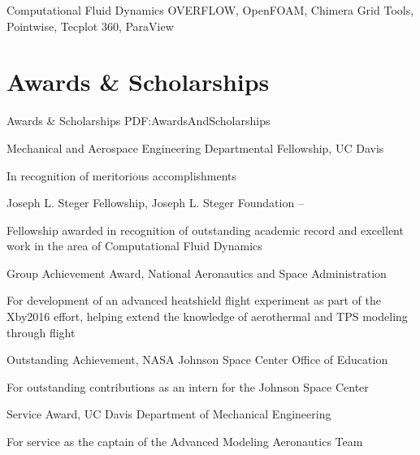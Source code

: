 \documentclass[letterpaper,MMMyyyy,nonstop]{simpleresumecv}
\begin{document}
\begin{body}
\GapNoBreak
Computational Fluid Dynamics
\BulletItem
OVERFLOW,
OpenFOAM,
Chimera Grid Tools,
Pointwise,
Tecplot 360,
ParaView





\section
{Awards \&\newline
Scholarships}
{Awards \& Scholarships}
{PDF:AwardsAndScholarships}

\BulletItem
Mechanical and Aerospace Engineering Departmental Fellowship,
UC Davis
\hfill
\begin{detail}
\SubItem
In recognition of meritorious accomplishments
\end{detail}

\Gap
\BulletItem
Joseph L. Steger Fellowship,
Joseph L. Steger Foundation
\hfill
 --
\begin{detail}
\SubItem
Fellowship awarded in recognition of outstanding academic record and excellent work in the area of Computational Fluid Dynamics
\end{detail}

\BulletItem
Group Achievement Award,
National Aeronautics and Space Administration
\hfill
\begin{detail}
\SubItem
For development of an advanced heatshield flight experiment as part of the Xby2016 effort, helping extend the knowledge of aerothermal and TPS modeling through flight
\end{detail}

\Gap
\BulletItem
Outstanding Achievement,
NASA Johnson Space Center Office of Education
\hfill
\begin{detail}
\SubItem
For outstanding contributions as an intern for the Johnson Space Center
\end{detail}

\Gap
\BulletItem
Service Award,
UC Davis Department of Mechanical Engineering
\hfill
\begin{detail}
\SubItem
For service as the captain of the Advanced Modeling Aeronautics Team
\end{detail}


\end{body}
\end{document}
